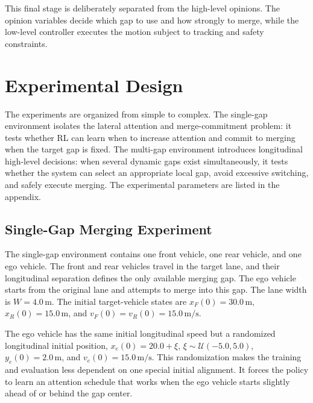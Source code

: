 This final stage is deliberately separated from the high-level opinions. The opinion variables decide which gap to use and how strongly to merge, while the low-level controller executes the motion subject to tracking and safety constraints.

\section{Experimental Design}





The experiments are organized from simple to complex. The single-gap environment isolates the lateral attention and merge-commitment problem: it tests whether RL can learn when to increase attention and commit to merging when the target gap is fixed. The multi-gap environment introduces longitudinal high-level decisions: when several dynamic gaps exist simultaneously, it tests whether the system can select an appropriate local gap, avoid excessive switching, and safely execute merging. The experimental parameters are listed in the appendix.



\subsection{Single-Gap Merging Experiment}





The single-gap environment contains one front vehicle, one rear vehicle, and one ego vehicle. The front and rear vehicles travel in the target lane, and their longitudinal separation defines the only available merging gap. The ego vehicle starts from the original lane and attempts to merge into this gap. The lane width is \(W=4.0\,\mathrm{m}\). The initial target-vehicle states are \(x_F(0)=30.0\,\mathrm{m}\), \(x_R(0)=15.0\,\mathrm{m}\), and \(v_F(0)=v_R(0)=15.0\,\mathrm{m/s}\).





The ego vehicle has the same initial longitudinal speed but a randomized longitudinal initial position, \(x_e(0)=20.0+\xi\), \(\xi\sim\mathcal{U}(-5.0,5.0)\), \(y_e(0)=2.0\,\mathrm{m}\), and \(v_e(0)=15.0\,\mathrm{m/s}\). This randomization makes the training and evaluation less dependent on one special initial alignment. It forces the policy to learn an attention schedule that works when the ego vehicle starts slightly ahead of or behind the gap center.





